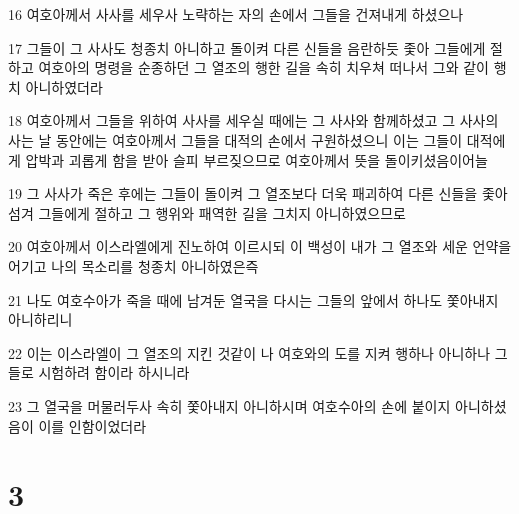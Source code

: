 \par 16 여호아께서 사사를 세우사 노략하는 자의 손에서 그들을 건져내게 하셨으나
\par 17 그들이 그 사사도 청종치 아니하고 돌이켜 다른 신들을 음란하듯 좇아 그들에게 절하고 여호아의 명령을 순종하던 그 열조의 행한 길을 속히 치우쳐 떠나서 그와 같이 행치 아니하였더라
\par 18 여호아께서 그들을 위하여 사사를 세우실 때에는 그 사사와 함께하셨고 그 사사의 사는 날 동안에는 여호아께서 그들을 대적의 손에서 구원하셨으니 이는 그들이 대적에게 압박과 괴롭게 함을 받아 슬피 부르짖으므로 여호아께서 뜻을 돌이키셨음이어늘
\par 19 그 사사가 죽은 후에는 그들이 돌이켜 그 열조보다 더욱 패괴하여 다른 신들을 좇아 섬겨 그들에게 절하고 그 행위와 패역한 길을 그치지 아니하였으므로
\par 20 여호아께서 이스라엘에게 진노하여 이르시되 이 백성이 내가 그 열조와 세운 언약을 어기고 나의 목소리를 청종치 아니하였은즉
\par 21 나도 여호수아가 죽을 때에 남겨둔 열국을 다시는 그들의 앞에서 하나도 쫓아내지 아니하리니
\par 22 이는 이스라엘이 그 열조의 지킨 것같이 나 여호와의 도를 지켜 행하나 아니하나 그들로 시험하려 함이라 하시니라
\par 23 그 열국을 머물러두사 속히 쫓아내지 아니하시며 여호수아의 손에 붙이지 아니하셨음이 이를 인함이었더라

\chapter{3}

